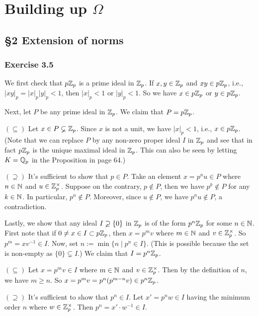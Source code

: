 \documentclass[../Koblitz.tex]{subfiles}
\begin{document}
\chapter{Building up \texorpdfstring{$\Omega$}{Omega}}

\section*{\S2 Extension of norms}

\subsection*{Exercise 3.5}

We first check that $p\mathbb{Z}_p$ is a prime ideal in $\mathbb{Z}_p$. If $x,y\in\mathbb{Z}_p$ and $xy\in p\mathbb{Z}_p$, i.e., $|xy|_p=|x|_p|y|_p<1$, then $|x|_p<1$ or $|y|_p<1$. So we have $x\in p\mathbb{Z}_p$ or $y\in p\mathbb{Z}_p$.

Next, let $P$ be any prime ideal in $\mathbb{Z}_p$. We claim that $P=p\mathbb{Z}_p$. 

$(\subseteq)$ Let $x\in P\varsubsetneq\mathbb{Z}_p$. Since $x$ is not a unit, we have $|x|_p<1$, i.e., $x\in p\mathbb{Z}_p$. (Note that we can replace $P$ by any non-zero proper ideal $I$ in $\mathbb{Z}_p$ and see that in fact $p\mathbb{Z}_p$ is the unique maximal ideal in $\mathbb{Z}_p$. This can also be seen by letting $K=\mathbb{Q}_p$ in the Proposition in page 64.)

$(\supseteq)$ It's sufficient to show that $p\in P$. Take an element $x=p^nu\in P$ where $n\in\mathbb{N}$ and $u\in\mathbb{Z}_p^\times$. Suppose on the contrary, $p\not\in P$, then we have $p^k\not\in P$ for any $k\in\mathbb{N}$. In particular, $p^n\not\in P$. Moreover, since $u\not\in P$, we have $p^nu\not\in P$, a contradiction.

Lastly, we show that any ideal $I\varsupsetneq \{0\}$ in $\mathbb{Z}_p$ is of the form $p^n\mathbb{Z}_p$ for some $n\in\mathbb{N}$. First note that if $0\neq x\in I\subset p\mathbb{Z}_p$, then $x=p^mv$ where $m\in\mathbb{N}$ and $v\in\mathbb{Z}_p^\times$. So $p^m=xv^{-1}\in I$. Now, set $n:=\min \{n\mid p^n\in I\}$. (This is possible because the set is non-empty as $\{0\}\varsubsetneq I$.) We claim that $I=p^n\mathbb{Z}_p$.

$(\subseteq)$ Let $x=p^mv\in I$ where $m\in\mathbb{N}$ and $v\in\mathbb{Z}_p^\times$. Then by the definition of $n$, we have $m\geq n$. So $x=p^mv=p^n(p^{m-n}v)\in p^n\mathbb{Z}_p$.

$(\supseteq)$ It's sufficient to show that $p^n\in I$. Let $x'=p^nw\in I$ having the minimum order $n$ where $w\in\mathbb{Z}_p^\times$. Then $p^n=x'\cdot w^{-1}\in I$.
\end{document}
